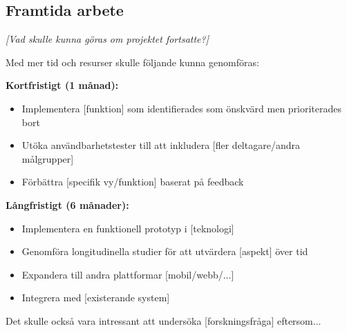 \subsection{Framtida arbete}

\textit{[Vad skulle kunna göras om projektet fortsatte?]}

Med mer tid och resurser skulle följande kunna genomföras:

\textbf{Kortfristigt (1 månad):}
\begin{itemize}
    \item Implementera [funktion] som identifierades som önskvärd men prioriterades bort
    \item Utöka användbarhetstester till att inkludera [fler deltagare/andra målgrupper]
    \item Förbättra [specifik vy/funktion] baserat på feedback
\end{itemize}

\textbf{Långfristigt (6 månader):}
\begin{itemize}
    \item Implementera en funktionell prototyp i [teknologi]
    \item Genomföra longitudinella studier för att utvärdera [aspekt] över tid
    \item Expandera till andra plattformar [mobil/webb/...]
    \item Integrera med [existerande system]
\end{itemize}

Det skulle också vara intressant att undersöka [forskningsfråga] eftersom...
